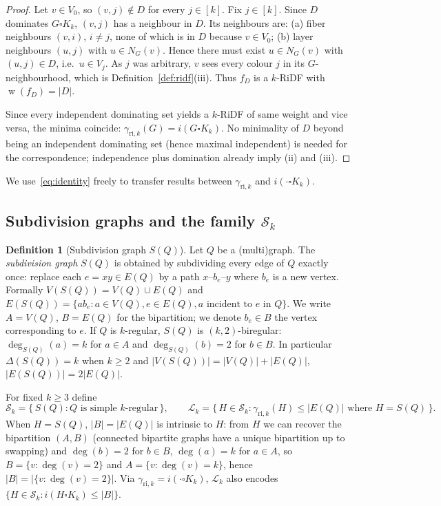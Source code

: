 \documentclass[11pt,a4paper]{article}
\theoremstyle{plain}
\theoremstyle{definition}
\newtheorem{definition}[theorem]{Definition}
\DeclareMathOperator{\weight}{w}
\newcommand{\gri}{\gamma_{\mathrm{ri},k}}
\newcommand{\cardK}{\square K_k}
\newcommand{\setK}{[k]}
\newcommand{\cS}{\mathcal{S}}
\newcommand{\cL}{\mathcal{L}}
\begin{document}
\begin{proof}
Let $v\in V_{0}$, so $(v,j)\notin D$ for every $j\in\setK$. Fix $j\in\setK$. Since $D$ dominates $G\cardK$, $(v,j)$ has a neighbour in $D$. Its neighbours are: (a) fiber neighbours $(v,i)$, $i\neq j$, none of which is in $D$ because $v\in V_{0}$; (b) layer neighbours $(u,j)$ with $u\in N_{G}(v)$. Hence there must exist $u\in N_{G}(v)$ with $(u,j)\in D$, i.e.\ $u\in V_{j}$. As $j$ was arbitrary, $v$ sees every colour $j$ in its $G$-neighbourhood, which is Definition~\ref{def:ridf}(iii). Thus $f_{D}$ is a $k$-RiDF with $\weight(f_{D})=|D|$.

Since every independent dominating set yields a $k$-RiDF of same weight and vice versa, the minima coincide: $\gri(G)=i(G\cardK)$. No minimality of $D$ beyond being an independent dominating set (hence maximal independent) is needed for the correspondence; independence plus domination already imply (ii) and (iii).
\end{proof}

We use~\eqref{eq:identity} freely to transfer results between $\gri$ and $i(\cdot\cardK)$.

\subsection{Subdivision graphs and the family \texorpdfstring{$\cS_{k}$}{S\_k}}

\begin{definition}[Subdivision graph $S(Q)$]\label{def:subdiv}
Let $Q$ be a (multi)graph. The \emph{subdivision graph} $S(Q)$ is obtained by subdividing every edge of $Q$ exactly once: replace each $e=xy\in E(Q)$ by a path $x$--$b_{e}$--$y$ where $b_{e}$ is a new vertex. Formally $V(S(Q))=V(Q)\cup E(Q)$ and $E(S(Q))=\{a b_{e}: a\in V(Q), e\in E(Q), a\text{ incident to }e\text{ in }Q\}$.
We write $A=V(Q)$, $B=E(Q)$ for the bipartition; we denote $b_{e}\in B$ the vertex corresponding to $e$.
If $Q$ is $k$-regular, $S(Q)$ is $(k,2)$-biregular: $\deg_{S(Q)}(a)=k$ for $a\in A$ and $\deg_{S(Q)}(b)=2$ for $b\in B$. In particular $\Delta(S(Q))=k$ when $k\ge 2$ and $|V(S(Q))|=|V(Q)|+|E(Q)|$, $|E(S(Q))|=2|E(Q)|$.
\end{definition}

For fixed $k\ge 3$ define
\[
\cS_{k}=\{\,S(Q): Q\text{ is simple $k$-regular}\,\},\qquad
\cL_{k}=\{\,H\in\cS_{k}: \gri(H)\le |E(Q)|\text{ where }H=S(Q)\,\}.
\]
When $H=S(Q)$, $|B|=|E(Q)|$ is intrinsic to $H$: from $H$ we can recover the bipartition $(A,B)$ (connected bipartite graphs have a unique bipartition up to swapping) and $\deg(b)=2$ for $b\in B$, $\deg(a)=k$ for $a\in A$, so $B=\{v:\deg(v)=2\}$ and $A=\{v:\deg(v)=k\}$, hence $|B|=|\{v:\deg(v)=2\}|$. Via $\gri=i(\cdot\cardK)$, $\cL_{k}$ also encodes $\{H\in\cS_{k}:i(H\cardK)\le|B|\}$.
\end{document}

